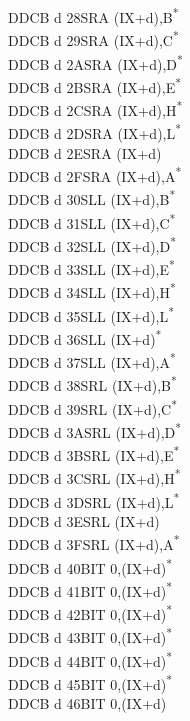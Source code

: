 \documentclass[twoside,openright,a4paper]{book}
\begin{document}
\begin{multicols}{3}
{\begin{tabbing}
	DDCB d 28\>SRA (IX+d),B\textsuperscript{*}\\
	DDCB d 29\>SRA (IX+d),C\textsuperscript{*}\\
	DDCB d 2A\>SRA (IX+d),D\textsuperscript{*}\\
	DDCB d 2B\>SRA (IX+d),E\textsuperscript{*}\\
	DDCB d 2C\>SRA (IX+d),H\textsuperscript{*}\\
	DDCB d 2D\>SRA (IX+d),L\textsuperscript{*}\\
	DDCB d 2E\>SRA (IX+d)\\
	DDCB d 2F\>SRA (IX+d),A\textsuperscript{*}\\
	DDCB d 30\>SLL (IX+d),B\textsuperscript{*}\\
	DDCB d 31\>SLL (IX+d),C\textsuperscript{*}\\
	DDCB d 32\>SLL (IX+d),D\textsuperscript{*}\\
	DDCB d 33\>SLL (IX+d),E\textsuperscript{*}\\
	DDCB d 34\>SLL (IX+d),H\textsuperscript{*}\\
	DDCB d 35\>SLL (IX+d),L\textsuperscript{*}\\
	DDCB d 36\>SLL (IX+d)\textsuperscript{*}\\
	DDCB d 37\>SLL (IX+d),A\textsuperscript{*}\\
	DDCB d 38\>SRL (IX+d),B\textsuperscript{*}\\
	DDCB d 39\>SRL (IX+d),C\textsuperscript{*}\\
	DDCB d 3A\>SRL (IX+d),D\textsuperscript{*}\\
	DDCB d 3B\>SRL (IX+d),E\textsuperscript{*}\\
	DDCB d 3C\>SRL (IX+d),H\textsuperscript{*}\\
	DDCB d 3D\>SRL (IX+d),L\textsuperscript{*}\\
	DDCB d 3E\>SRL (IX+d)\\
	DDCB d 3F\>SRL (IX+d),A\textsuperscript{*}\\
	DDCB d 40\>BIT 0,(IX+d)\textsuperscript{*}\\
	DDCB d 41\>BIT 0,(IX+d)\textsuperscript{*}\\
	DDCB d 42\>BIT 0,(IX+d)\textsuperscript{*}\\
	DDCB d 43\>BIT 0,(IX+d)\textsuperscript{*}\\
	DDCB d 44\>BIT 0,(IX+d)\textsuperscript{*}\\
	DDCB d 45\>BIT 0,(IX+d)\textsuperscript{*}\\
	DDCB d 46\>BIT 0,(IX+d)\\

\end{tabbing}}
\end{multicols}
\end{document}
